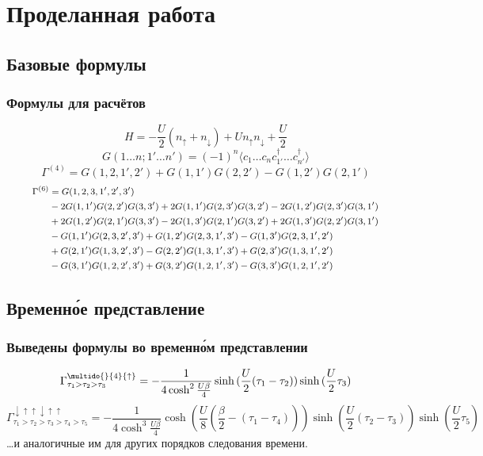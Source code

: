 \documentclass{beamer}
\begin{document}
\section{Проделанная работа}
\subsection{Базовые формулы}
\begin{frame}
 \frametitle{Формулы для расчётов}
 \pause
 \[ H = -\frac{U}{2} \left(n_{\uparrow}+n_{\downarrow}\right) + U n_{\uparrow} n_{\downarrow} + \frac{U}{2} \] \pause
 \[ G(1\dots n;1'\dots n') = (-1)^n \langle c_1\dots c_n c_{1'}^\dagger\dots c_{n'}^\dagger\rangle \] \pause
 \[ \Gamma^{(4)} = G(1,2,1',2')+G(1,1')G(2,2')-G(1,2')G(2,1') \] \pause
 \[ \footnotesize\begin{aligned}
      \Gamma^{(6)} & = G(1, 2, 3, 1', 2', 3') \\
      & -2 G(1, 1') G(2, 2') G(3, 3') 
      +2 G(1, 1') G(2, 3') G(3, 2')
      -2 G(1, 2') G(2, 3') G(3, 1') \\ 
      & +2 G(1, 2') G(2, 1') G(3, 3')
      -2 G(1, 3') G(2, 1') G(3, 2')
      +2 G(1, 3') G(2, 2') G(3, 1') \\
      & -G(1, 1') G(2, 3, 2', 3')
      +G(1, 2') G(2, 3, 1', 3')
      -G(1, 3') G(2, 3, 1', 2') \\
      & +G(2, 1') G(1, 3, 2', 3')
      -G(2, 2') G(1, 3, 1', 3')
      +G(2, 3') G(1, 3, 1', 2') \\
      & -G(3, 1') G(1, 2, 2', 3')
      +G(3, 2') G(1, 2, 1', 3')
      -G(3, 3') G(1, 2, 1', 2')
    \end{aligned} 
 \]
\end{frame}

\subsection{Временн\'{о}е представление}
\begin{frame}
 \frametitle{Выведены формулы во временн\'{о}м представлении}
 \pause 
 \[ \Gamma_{\tau_1>\tau_2>\tau_3}^{\multido{}{4}{\uparrow}} = -\frac{1}{4\cosh^2{\frac{U\beta}{4}}}\sinh{(\frac{U}{2}(\tau_1-\tau_2))}\sinh{(\frac{U}{2}\tau_3)} \]
 \pause
 \scriptsize\[ \Gamma_{\tau_1>\tau_2>\tau_3>\tau_4>\tau_5}^{\downarrow\uparrow\uparrow\downarrow\uparrow\uparrow} = 
    -\frac{1}{4\cosh^3{\frac{U\beta}{4}}}\cosh{(\frac{U}{8}(\frac{\beta}{2}-(\tau_1-\tau_4)))}
      \sinh{(\frac{U}{2}(\tau_2-\tau_3))}\sinh{(\frac{U}{2}\tau_5)} \]
 \pause
  \normalsize\dots и аналогичные им для других порядков следования времени.
\end{frame}
\end{document}
